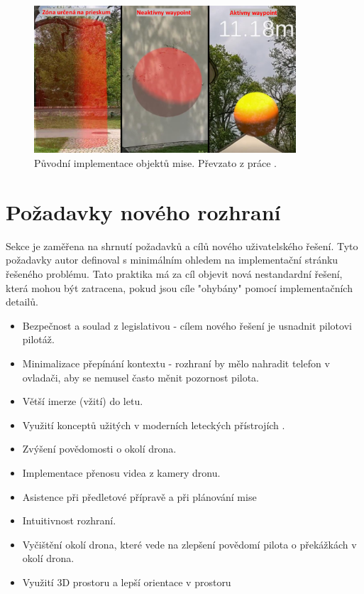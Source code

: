 \begin{figure}[H]
	\centering
	\includegraphics[width=0.87\textwidth]{obrazky-figures/navrh/prevMisionObject.pdf}
	\caption{Původní implementace objektů mise. Převzato z práce \cite{KyjacMartin2022Vnpp}.}
	\label{pic:prevMisionObject}
\end{figure}

\section{Požadavky nového rozhraní}
Sekce je zaměřena na shrnutí požadavků a cílů  nového uživatelského řešení. Tyto požadavky autor definoval s minimálním ohledem na implementační stránku řešeného problému. Tato praktika  má za cíl objevit nová nestandardní řešení, která mohou být zatracena, pokud jsou cíle "ohybány" pomocí implementačních detailů. 

\begin{itemize}
    \item Bezpečnost a soulad z legislativou - cílem nového řešení je usnadnit pilotovi pilotáž.
    
    \item Minimalizace přepínání kontextu - rozhraní by mělo nahradit telefon v ovladači, aby se nemusel často měnit pozornost pilota.

    \item Větší imerze (vžití) do letu.
    
    \item Využití konceptů užitých v moderních leteckých přístrojích .
    
    \item Zvýšení povědomosti o okolí drona.
    
    \item Implementace přenosu videa z kamery dronu.
    
    \item Asistence při předletové přípravě a při plánování mise 
    
    \item Intuitivnost rozhraní.

    \item Vyčištění okolí drona, které vede na zlepšení povědomí pilota o překážkách v okolí drona.
    
    \item Využití 3D prostoru a lepší orientace v prostoru
    
\end{itemize}

